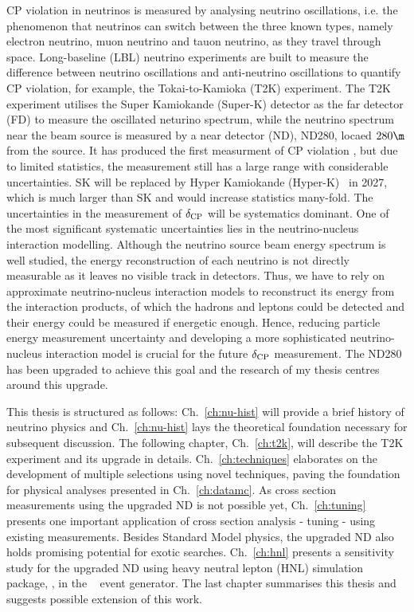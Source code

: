 CP violation in neutrinos is measured by analysing neutrino oscillations, i.e. the phenomenon that neutrinos can switch between the three known types, namely electron neutrino, muon neutrino and tauon neutrino, as they travel through space. 
Long-baseline (LBL) neutrino experiments are built to measure the difference between neutrino oscillations and anti-neutrino oscillations to quantify CP violation, for example, the Tokai-to-Kamioka (T2K) experiment. 
The T2K experiment utilises the Super Kamiokande (Super-K) detector as the far detector (FD) to measure the oscillated neturino spectrum, while the neutrino spectrum near the beam source is measured by a near detector (ND), ND280, locaed $280\m$ from the source. 
It has produced the first measurment of CP violation \cite{T2K:2019bcf}, but due to limited statistics, the measurement still has a large range with considerable uncertainties.
SK will be replaced by Hyper Kamiokande (Hyper-K)~\cite{Hyper-Kamiokande:2018ofw} in 2027, which is much larger than SK and would increase statistics many-fold. 
The uncertainties in the measurement of $\delta_\textrm{CP}$ will be systematics dominant. 
One of the most significant systematic uncertainties lies in the neutrino-nucleus interaction modelling. 
Although the neutrino source beam energy spectrum is well studied, the energy reconstruction of each neutrino is not directly measurable as it leaves no visible track in detectors. 
Thus, we have to rely on approximate neutrino-nucleus interaction models to reconstruct its energy from the interaction products, of which the hadrons and leptons could be detected and their energy could be measured if energetic enough. 
Hence, reducing particle energy measurement uncertainty and developing a more sophisticated neutrino-nucleus interaction model is crucial for the future $\delta_\textrm{CP}$ measurement. 
The ND280 has been upgraded to achieve this goal and the research of my thesis centres around this upgrade. 

This thesis is structured as follows: Ch.~\ref{ch:nu-hist} will provide a brief history of neutrino physics and Ch.~\ref{ch:nu-hist} lays the theoretical foundation necessary for subsequent discussion. 
The following chapter, Ch.~\ref{ch:t2k}, will describe the T2K experiment and its upgrade in details. 
Ch.~\ref{ch:techniques} elaborates on the development of multiple selections using novel techniques, paving the foundation for physical analyses presented in Ch.~\ref{ch:datamc}. 
As cross section measurements using the upgraded ND is not possible yet, Ch.~\ref{ch:tuning} presents one important application of cross section analysis - tuning - using existing measurements.
Besides Standard Model physics, the upgraded ND also holds promising potential for exotic searches.
Ch.~\ref{ch:hnl} presents a sensitivity study for the upgraded ND using heavy neutral lepton (HNL) simulation package, , in the \genie~\cite{Andreopoulos:2015wxa} event generator.
The last chapter summarises this thesis and suggests possible extension of this work.


